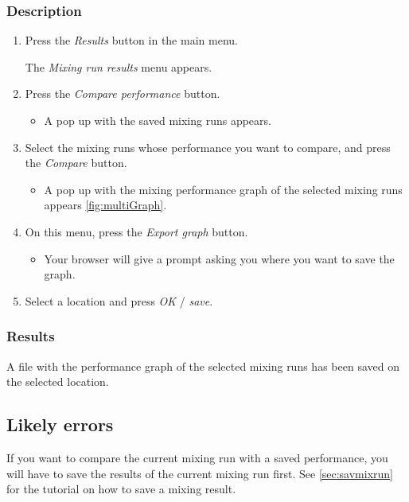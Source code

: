 \subsubsection{Description}
\begin{enumerate}
	\item Press the \emph{Results} button in the main menu.
		\begin{itemize}
            The \emph{Mixing run results} menu appears.
		\end{itemize}
	\item Press the \emph{Compare performance} button.
		\begin{itemize}
            \item A pop up with the saved mixing runs appears.
		\end{itemize}
	\item Select the mixing runs whose performance you want to compare, and press the \emph{Compare} button.
		\begin{itemize}
            \item A pop up with the mixing performance graph of the selected mixing runs appears \ref{fig:multiGraph}.
		\end{itemize}
	\item On this menu, press the \emph{Export graph} button.
        \begin{itemize}
            \item Your browser will give a prompt asking you where you want to save the graph.
        \end{itemize}
	\item  Select a location and press \emph{OK} / \emph{save}.
\end{enumerate}


\subsubsection{Results}
A file with the performance graph of the selected mixing runs has been saved on the selected location.

\subsection{Likely errors}
If you want to compare the current mixing run with a saved performance, you will have to save the results of the current mixing run first. See \ref{sec:savmixrun} for the tutorial on how to save a mixing result.

